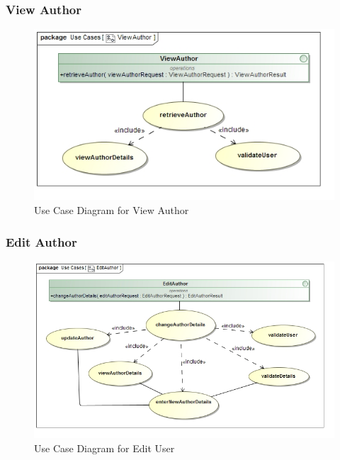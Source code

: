 \documentclass[a4paper,10pt]{article}
\begin{document}
\subsubsection{View Author}
	\begin{figure}[H]
		\includegraphics[scale=0.5]{UseViewAuthor}
		\caption{Use Case Diagram for View Author}
	\end{figure}
	
\subsubsection{Edit Author}
	\begin{figure}[H]
		\includegraphics[scale=0.5]{UseEditAuthor}
		\caption{Use Case Diagram for Edit User}
	\end{figure}
\end{document}
